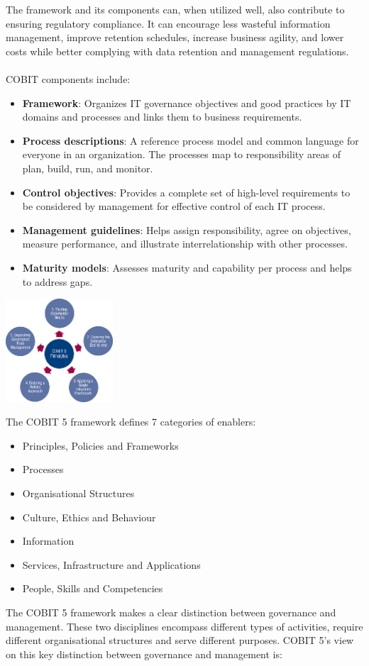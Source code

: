 \documentclass[8pt]{extarticle}
\begin{document}
\begin{multicols}{3}
The framework and its components can, when utilized well, also contribute to ensuring regulatory compliance.
It can encourage less wasteful information management, improve retention schedules, increase business agility, and 
lower costs while better complying with data retention and management regulations. \\
\\
COBIT components include:\\
\begin{itemize}
    \item \textbf{Framework}: Organizes IT governance objectives and good practices by IT domains and processes and links them to business requirements.
    \item \textbf{Process descriptions}: A reference process model and common language for everyone in an organization. The processes map to responsibility areas of plan, build, run, and monitor.
    \item \textbf{Control objectives}: Provides a complete set of high-level requirements to be considered by management for effective control of each IT process.
    \item \textbf{Management guidelines}: Helps assign responsibility, agree on objectives, measure performance, and illustrate interrelationship with other processes.
    \item \textbf{Maturity models}: Assesses maturity and capability per process and helps to address gaps.
\end{itemize}



\begin{center}
    \includegraphics[width=4cm]{cobit-fw.jpg}\\
\end{center}
\noindent
The COBIT 5 framework defines
7 categories of enablers:
\begin{itemize}
    \item Principles, Policies and Frameworks
    \item Processes
    \item Organisational Structures
    \item Culture, Ethics and Behaviour
    \item Information
    \item Services, Infrastructure and Applications
    \item People, Skills and Competencies
\end{itemize}
\vspace{1em}
\noindent
The COBIT 5 framework makes a clear distinction between
governance and management. These two disciplines encompass
different types of activities, require different organisational structures
and serve different purposes. COBIT 5’s view on this key distinction
between governance and management is:


\end{multicols}
\end{document}
